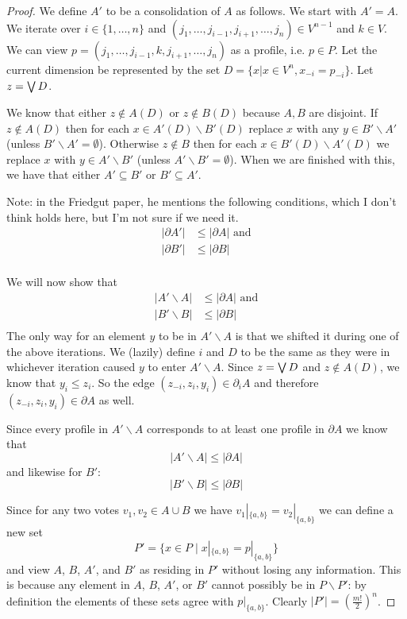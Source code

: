 	\begin{proof}
		We define $A'$ to be a consolidation of $A$ as follows. We start with $A' = A$. We iterate over $i \in \{1, \ldots, n\}$ and $(j_1, \ldots, j_{i-1}, j_{i+1}, \ldots, j_n) \in V^{n-1}$ and $k \in V$. We can view $p = (j_1, \ldots, j_{i-1}, k, j_{i+1}, \ldots, j_n)$ as a profile, i.e. $p \in P$. Let the current dimension be represented by the set $D = \{x | x \in V^n, x_{-i} = p_{-i}\}$. Let $z = \operatorname{\bigvee} D$.

		We know that either $z \notin A(D)$ or $z \notin B(D)$ because $A, B$ are disjoint. If $z \notin A(D)$ then for each $x \in A'(D) \backslash B'(D)$ replace $x$ with any $y \in B' \backslash A'$ (unless $B' \backslash A' = \emptyset$). Otherwise $z \notin B$ then for each $x \in B'(D) \backslash A'(D)$ we replace $x$ with $y \in A' \backslash B'$ (unless $A' \backslash B' = \emptyset$). When we are finished with this, we have that either $A' \subseteq B'$ or $B' \subseteq A'$.

		Note: in the Friedgut paper, he mentions the following conditions, which I don't think holds here, but I'm not sure if we need it.
		\begin{align*}
			|\partial A'| &\le |\partial A| \textrm{ and} \\
			|\partial B'| &\le |\partial B| \\
		\end{align*}

		We will now show that
		\begin{align*}
			|A' \backslash A| &\le |\partial A| \textrm{ and} \\
			|B' \backslash B| &\le |\partial B| \\
		\end{align*}
		The only way for an element $y$ to be in $A' \backslash A$ is that we shifted it during one of the above iterations. We (lazily) define $i$ and $D$ to be the same as they were in whichever iteration caused $y$ to enter $A' \backslash A$. Since $z = \operatorname{\bigvee} D$ and $z \notin A(D)$, we know that $y_i \le z_i$. So the edge $(z_{-i}, z_i, y_i) \in \partial_i A$ and therefore $(z_{-i}, z_i, y_i) \in \partial A$ as well.

		Since every profile in $A' \backslash A$ corresponds to at least one profile in $\partial A$ we know that
		\[
			|A' \backslash A| \le |\partial A|
		\]
		and likewise for $B'$:
		\[
			|B' \backslash B| \le |\partial B|
		\]

		Since for any two votes $v_1, v_2 \in A \cup B$ we have $v_1|_{\{a,b\}} = v_2|_{\{a,b\}}$ we can define a new set
		\[
			P' = \{x \in P \mid x|_{\{a,b\}} = p|_{\{a,b\}}\}
		\]
		and view $A$, $B$, $A'$, and $B'$ as residing in $P'$ without losing any information. This is because any element in $A$, $B$, $A'$, or $B'$ cannot possibly be in $P \backslash P'$: by definition the elements of these sets agree with $p|_{\{a,b\}}$. Clearly $|P'| = (\frac{m!}{2})^n$.


\end{proof}

